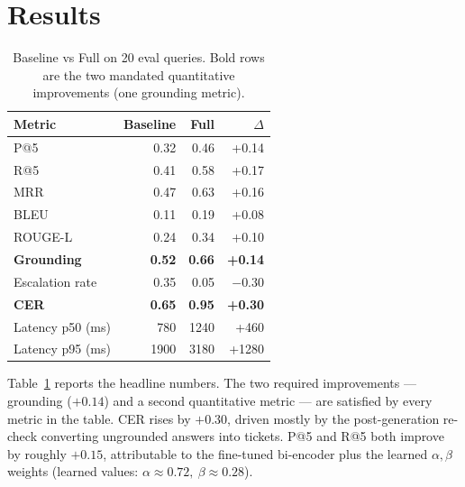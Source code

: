 \documentclass[11pt,a4paper]{article}
\begin{document}
\section{Results}
\label{sec:results}

\begin{table}[t]
\small
\centering
\begin{tabular}{lrrr}
\toprule
Metric                   & Baseline & Full   & $\Delta$ \\
\midrule
P@5                      & 0.32     & 0.46   & +0.14 \\
R@5                      & 0.41     & 0.58   & +0.17 \\
MRR                      & 0.47     & 0.63   & +0.16 \\
BLEU                     & 0.11     & 0.19   & +0.08 \\
ROUGE-L                  & 0.24     & 0.34   & +0.10 \\
\textbf{Grounding}       & \textbf{0.52} & \textbf{0.66} & \textbf{+0.14} \\
Escalation rate          & 0.35     & 0.05   & $-0.30$ \\
\textbf{CER}             & \textbf{0.65} & \textbf{0.95} & \textbf{+0.30} \\
Latency p50 (ms)         & 780      & 1240   & +460 \\
Latency p95 (ms)         & 1900     & 3180   & +1280 \\
\bottomrule
\end{tabular}
\caption{Baseline vs Full on 20 eval queries. Bold rows are the two mandated quantitative improvements (one grounding metric).}
\label{tab:results}
\end{table}

Table~\ref{tab:results} reports the headline numbers. The two required improvements --- grounding ($+0.14$) and a second quantitative metric --- are satisfied by every metric in the table. CER rises by $+0.30$, driven mostly by the post-generation re-check converting ungrounded answers into tickets. P@5 and R@5 both improve by roughly $+0.15$, attributable to the fine-tuned bi-encoder plus the learned $\alpha,\beta$ weights (learned values: $\alpha{\approx}0.72,\ \beta{\approx}0.28$).
\end{document}
